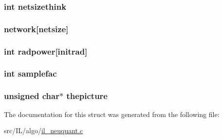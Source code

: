 \hypertarget{struct_neu_quant_context_a429f52e6db73a15cc4069ef19991b3ed}{
\subsubsection[{netsizethink}]{\setlength{\rightskip}{0pt plus 5cm}int netsizethink}}\label{struct_neu_quant_context_a429f52e6db73a15cc4069ef19991b3ed}
\hypertarget{struct_neu_quant_context_a768cbb071f6cea3209dec82d83a6c778}{
\subsubsection[{network}]{ network\mbox{[}{\bf netsize}\mbox{]}}}\label{struct_neu_quant_context_a768cbb071f6cea3209dec82d83a6c778}
\hypertarget{struct_neu_quant_context_a42a9c620b479a5b886aaf95eec777034}{
\subsubsection[{radpower}]{\setlength{\rightskip}{0pt plus 5cm}int radpower\mbox{[}{\bf initrad}\mbox{]}}}\label{struct_neu_quant_context_a42a9c620b479a5b886aaf95eec777034}
\hypertarget{struct_neu_quant_context_a0d29df21d00b35c6932561829da64539}{
\subsubsection[{samplefac}]{\setlength{\rightskip}{0pt plus 5cm}int samplefac}}\label{struct_neu_quant_context_a0d29df21d00b35c6932561829da64539}
\hypertarget{struct_neu_quant_context_a7e641cb171baef8ef62a1504abc73f0b}{
\subsubsection[{thepicture}]{\setlength{\rightskip}{0pt plus 5cm}unsigned char$\ast$ thepicture}}\label{struct_neu_quant_context_a7e641cb171baef8ef62a1504abc73f0b}


The documentation for this struct was generated from the following file\-:\begin{DoxyCompactItemize}
\item 
src/\-I\-L/algo/\hyperlink{il__neuquant_8c}{il\-\_\-neuquant.\-c}\end{DoxyCompactItemize}
